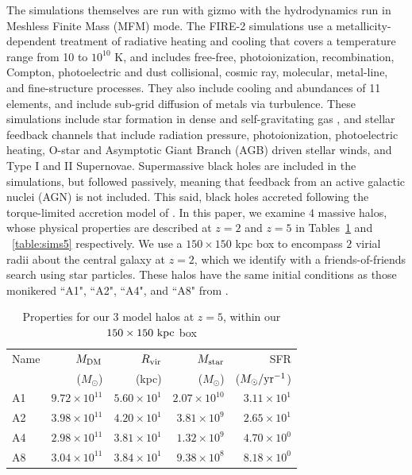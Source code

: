 The simulations themselves are run with {\sc gizmo} \citep{Hopkins2015} with the hydrodynamics run in Meshless Finite Mass (MFM) mode.
The FIRE-2 simulations use a metallicity-dependent treatment of radiative heating and cooling that covers a temperature range from 10 to $10^{10}$ K, and includes free-free, photoionization, recombination, Compton, photoelectric and dust collisional, cosmic ray, molecular, metal-line, and fine-structure processes.
They also include cooling and abundances of 11 elements, and include sub-grid diffusion of metals via turbulence.
These simulations include star formation in dense and self-gravitating gas \citep{Hopkins2013}, and stellar feedback channels that include radiation pressure, photoionization, photoelectric heating, O-star and Asymptotic Giant Branch (AGB) driven stellar winds, and Type I and II Supernovae.
Supermassive black holes are included in the simulations, but followed passively, meaning that feedback from an active galactic nuclei (AGN) is not included.
This said, black holes accreted following the torque-limited accretion model of \citet{Anglesalcazar2017a,Anglesalcazar2017b}.
In this paper, we examine $4$ massive halos, whose physical properties are described at $z=2$ and $z=5$ in Tables~\ref{table:sims2} and ~\ref{table:sims5} respectively.
We use a $150 \times 150$ kpc box to encompass $2$ virial radii about the central galaxy at $z=2$, which we identify with a friends-of-friends search using star particles.
These halos have the same initial conditions as those monikered ``A1", ``A2", ``A4", and ``A8" from \citet{Feldmann2016}.

\begin{table}
\caption{Properties for our 3 model halos at $z=5$, within our $150 \times 150\ \rm kpc$ box}
\centering
\begin{tabular}{l r r r r}
Name & $M_{\rm DM}$ & $R_{\rm vir}$ & $M_{\rm star}$ & SFR \\
   & ($M_\odot$) & (kpc) & ($M_\odot$) & ($M_\odot / \rm yr ^{-1}$)\\ \hline
A1 & $9.72\times 10^{11}$ & $5.60 \times 10^1$  & $2.07 \times 10^{10}$ & $3.11\times10^1$ \\ \hline
A2 & $3.98\times 10^{11}$ & $4.20 \times 10^1$  & $3.81 \times 10^{9}$ & $2.65\times10^1$ \\ \hline
A4 & $2.98\times 10^{11}$ & $3.81 \times 10^1$  & $1.32 \times 10^{9}$ & $4.70\times10^0$ \\ \hline
A8 & $3.04\times 10^{11}$ & $3.84 \times 10^1$ & $9.38 \times 10^{8}$ & $8.18\times10^0$ \\
\hline
\end{tabular}
\label{table:sims2}
\end{table}

